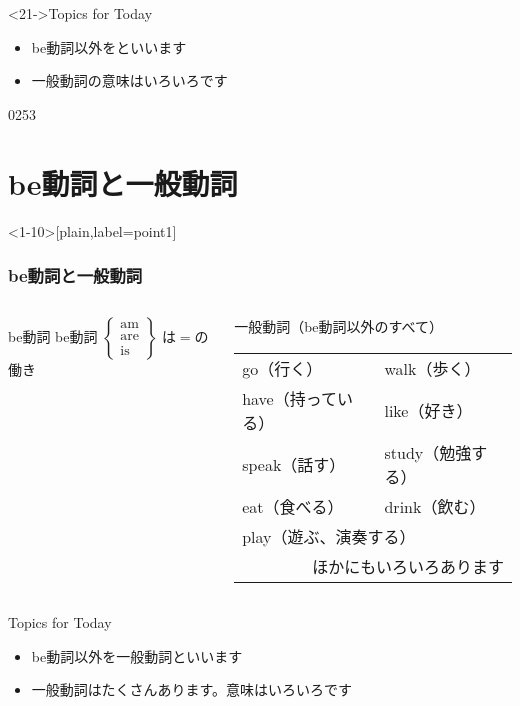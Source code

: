 \documentclass[aspectratio=169,xcolor={dvipsnames,table}]{beamer}
\newcommand{\myaudio}[1]{\href{#1}{\faVolumeUp}}
\begin{document}
\begin{frame}[plain,label=is_verb]
\bigskip

\begin{block}<21->{Topics for Today}
\begin{itemize}[square]
 \item  {be動詞以外をといいます}
 \item<28-> {一般動詞の意味はいろいろです}
\end{itemize}
      \end{block}



\hfill{\tiny 0253}\,\scriptsize \myaudio{./audio/004_verb_01.mp3}

\end{frame}
\section{be動詞と一般動詞}
\begin{frame}<1-10>[plain,label=point1]\frametitle{be動詞と一般動詞}

\begin{columns}
\begin{column}[t]{.38\textwidth}
\begin{exampleblock}{be動詞}
be動詞
{\footnotesize
$
 \left\{
\begin{array}{l}
\text{am}\\
\text{are}\\
\text{is}
\end{array}\right\}
$
}
は$=$の働き
\end{exampleblock}
\end{column}
\pause
\begin{column}[t]{.52\textwidth}
\begin{alertblock}{一般動詞（be動詞以外のすべて）}
\begin{tabular}[t]{ll}
go（行く）&walk（歩く）\pause\\
have（持っている）&like（好き）\pause\\
speak（話す）&study（勉強する）\pause\\
eat（食べる）& drink（飲む）\pause\\
\multicolumn{2}{l}{play（遊ぶ、演奏する）\pause}\\
\multicolumn{2}{r}{ほかにもいろいろあります}\\
\end{tabular}
\end{alertblock}
\end{column}
\end{columns}


\bigskip
\pause
\begin{block}{Topics for Today}
\begin{itemize}[<+- |alert@+>][square]
 \item  be動詞以外を一般動詞といいます
 \item 一般動詞はたくさんあります。意味はいろいろです
\end{itemize}
     \end{block}

\end{frame}
\end{document}
